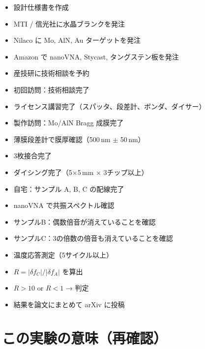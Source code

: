 \documentclass[11pt,a4paper]{article}
\begin{document}
\begin{itemize}
\item[$\square$] 設計仕様書を作成
\item[$\square$] MTI / 信光社に水晶ブランクを発注
\item[$\square$] Nilaco に Mo, AlN, Au ターゲットを発注
\item[$\square$] Amazon で nanoVNA, Stycast, タングステン板を発注
\item[$\square$] 産技研に技術相談を予約
\item[$\square$] 初回訪問：技術相談完了
\item[$\square$] ライセンス講習完了（スパッタ、段差計、ボンダ、ダイサー）
\item[$\square$] 製作訪問：Mo/AlN Bragg 成膜完了
\item[$\square$] 薄膜段差計で膜厚確認（500\,nm $\pm$ 50\,nm）
\item[$\square$] 3枚接合完了
\item[$\square$] ダイシング完了（5$\times$5\,mm $\times$ 3チップ以上）
\item[$\square$] 自宅：サンプル A, B, C の配線完了
\item[$\square$] nanoVNA で共振スペクトル確認
\item[$\square$] サンプルB：偶数倍音が消えていることを確認
\item[$\square$] サンプルC：3の倍数の倍音も消えていることを確認
\item[$\square$] 温度応答測定（5サイクル以上）
\item[$\square$] $R = |\delta f_C| / |\delta f_A|$ を算出
\item[$\square$] $R > 10$ or $R < 1$ → 判定
\item[$\square$] 結果を論文にまとめて arXiv に投稿
\end{itemize}


\section{この実験の意味（再確認）}
\end{document}
